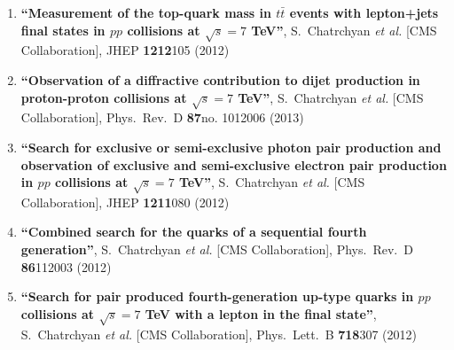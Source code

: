 \begin{enumerate}
\item%
{\bf ``Measurement of the top-quark mass in $t\bar{t}$ events with lepton+jets final states in $pp$ collisions at $\sqrt{s}=7$ TeV''}, 
  S.~Chatrchyan {\it et al.}  [CMS Collaboration], 
JHEP {\bf 1212}105 (2012) %


\item%
{\bf ``Observation of a diffractive contribution to dijet production in proton-proton collisions at $\sqrt{s}=7$ TeV''}, 
  S.~Chatrchyan {\it et al.}  [CMS Collaboration], 
Phys.\ Rev.\ D {\bf 87}no. 1012006 (2013) %


\item%
{\bf ``Search for exclusive or semi-exclusive photon pair production and observation of exclusive and semi-exclusive electron pair production in $pp$ collisions at $\sqrt{s}=7$ TeV''}, 
  S.~Chatrchyan {\it et al.}  [CMS Collaboration], 
JHEP {\bf 1211}080 (2012) %


\item%
{\bf ``Combined search for the quarks of a sequential fourth generation''}, 
  S.~Chatrchyan {\it et al.}  [CMS Collaboration], 
Phys.\ Rev.\ D {\bf 86}112003 (2012) %


\item%
{\bf ``Search for pair produced fourth-generation up-type quarks in $pp$ collisions at $\sqrt{s}=7$ TeV with a lepton in the final state''}, 
  S.~Chatrchyan {\it et al.}  [CMS Collaboration], 
Phys.\ Lett.\ B {\bf 718}307 (2012) %



\end{enumerate}

